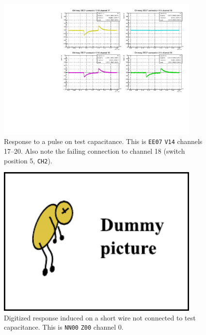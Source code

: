 \begin{figure}
  \centering
    \includegraphics[width=0.9\textwidth]{fig/CPULSEWaves_ChimneyEE07_ConnV14_Pos5}
  \caption{
    Response to a pulse on test capacitance.
    This is \texttt{EE07} \texttt{V14} channels 17--20.
    Also note the failing connection to channel 18 (switch position 5, \texttt{CH2}).
    \label{fig:TestPulseResponse}
    \label{fig:TestBoxDeadChannel}
  }
\end{figure}
\begin{figure}
  \centering
    \includegraphics[width=0.9\textwidth]{fig/dummy}
  \caption{
    Digitized response induced on a short wire not connected to test capacitance.
    This is \texttt{NN00} \texttt{Z00} channel 0.
    \label{fig:TestPulseResponseShortWires}
  }
\end{figure}
